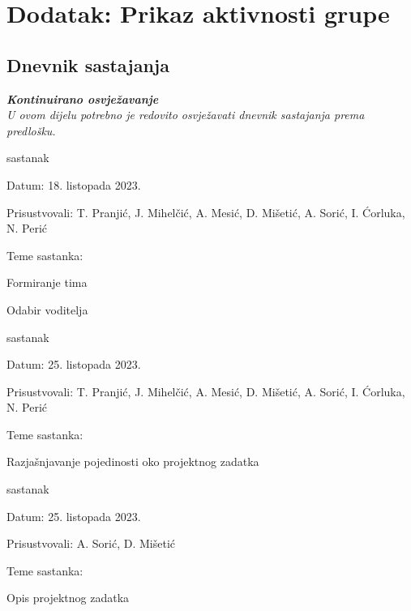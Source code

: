 \chapter*{Dodatak: Prikaz aktivnosti grupe}
		
		\section*{Dnevnik sastajanja}
		
		\textbf{\textit{Kontinuirano osvježavanje}}\\
		
		 \textit{U ovom dijelu potrebno je redovito osvježavati dnevnik sastajanja prema predlošku.}
		
		\begin{packed_enum}
			\item  sastanak
			
			\item[] \begin{packed_item}
				\item Datum: 18. listopada 2023.
				\item Prisustvovali: T. Pranjić, J. Mihelčić, A. Mesić, D. Mišetić, A. Sorić, I. Ćorluka, N. Perić
				\item Teme sastanka:
				\begin{packed_item}
					\item Formiranje tima
					\item Odabir voditelja
				\end{packed_item}
			\end{packed_item}
			
			\item  sastanak
			\item[] \begin{packed_item}
				\item Datum: 25. listopada 2023.
				\item Prisustvovali: T. Pranjić, J. Mihelčić, A. Mesić, D. Mišetić, A. Sorić, I. Ćorluka, N. Perić
				\item Teme sastanka:
				\begin{packed_item}
					\item  Razjašnjavanje pojedinosti oko projektnog zadatka

				\end{packed_item}
			\end{packed_item}
      
      \item  sastanak
			\item[] \begin{packed_item}
			  \item Datum: 25. listopada 2023.
				\item Prisustvovali: A. Sorić, D. Mišetić
				\item Teme sastanka:
				\begin{packed_item}
					\item  Opis projektnog zadatka
        \end{packed_item}
      \end{packed_item}
			

\end{packed_enum}
